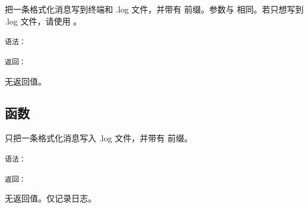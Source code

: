 把一条格式化消息写到终端和 .log 文件，并带有  前缀。参数与  相同。若只想写到 .log 文件，请使用 。

\medskip
\texttt{语法： }

\begin{center}
\end{center}

\medskip
\texttt{返回： }

无返回值。

\subsection{函数 }
\label{sub:function_utils_wlog}

只把一条格式化消息写入 .log 文件，并带有  前缀。

\medskip
\texttt{语法： }

\begin{center}
\end{center}

\medskip
\texttt{返回： }

无返回值。仅记录日志。
\endinput